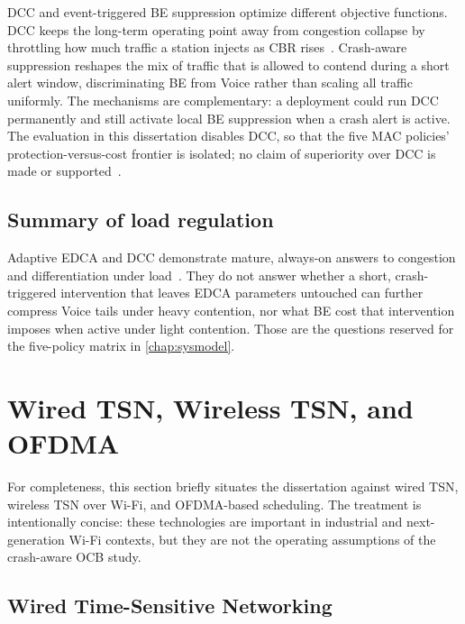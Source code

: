 DCC and event-triggered BE suppression optimize different objective functions.
DCC keeps the long-term operating point away from congestion collapse by throttling how much traffic a station injects as CBR rises~\cite{etsi_dcc_2018}.
Crash-aware suppression reshapes the mix of traffic that is allowed to contend during a short alert window, discriminating BE from Voice rather than scaling all traffic uniformly.
The mechanisms are complementary: a deployment could run DCC permanently and still activate local BE suppression when a crash alert is active.
The evaluation in this dissertation disables DCC, so that the five MAC policies' protection-versus-cost frontier is isolated; no claim of superiority over DCC is made or supported~\cite{etsi_dcc_2018}.

\subsection{Summary of load regulation}
\label{sec:rw:alwayson-synth}

Adaptive EDCA and DCC demonstrate mature, always-on answers to congestion and differentiation under load~\cite{romdhani2003AdaptiveEDCF,etsi_dcc_2018,Evolution_QoS_Mechanisms}.
They do not answer whether a short, crash-triggered intervention that leaves EDCA parameters untouched can further compress Voice tails under heavy contention, nor what BE cost that intervention imposes when active under light contention.
Those are the questions reserved for the five-policy matrix in \autoref{chap:sysmodel}.

\section{Wired TSN, Wireless TSN, and OFDMA}
\label{sec:rw:tsn-ofdma}

For completeness, this section briefly situates the dissertation against wired TSN, wireless TSN over Wi-Fi, and OFDMA-based scheduling.
The treatment is intentionally concise: these technologies are important in industrial and next-generation Wi-Fi contexts, but they are not the operating assumptions of the crash-aware OCB study.

\subsection{Wired Time-Sensitive Networking}
\label{sec:rw:wired-tsn}

